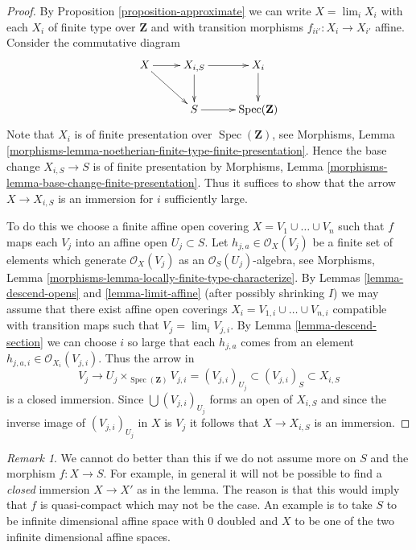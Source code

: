 \documentclass{stacks-project}
\theoremstyle{plain}
\theoremstyle{definition}
\theoremstyle{remark}
\newtheorem{remark}[subsection]{Remark}
\numberwithin{equation}{subsection}
\def\lim{\mathop{\mathrm{lim}}\nolimits}
\def\Spec{\mathop{\mathrm{Spec}}}
\begin{document}
\begin{proof}
By
Proposition \ref{proposition-approximate}
we can write
$X = \lim_i X_i$ with each $X_i$ of finite type over $\mathbf{Z}$ and
with transition morphisms $f_{ii'} : X_i \to X_{i'}$ affine.
Consider the commutative diagram
$$
\xymatrix{
X \ar[r] \ar[rd] & X_{i, S} \ar[r] \ar[d] & X_i \ar[d] \\
& S \ar[r] & \Spec(\mathbf{Z})
}
$$
Note that $X_i$ is of finite presentation over $\Spec(\mathbf{Z})$, see
Morphisms,
Lemma \ref{morphisms-lemma-noetherian-finite-type-finite-presentation}.
Hence the base change $X_{i, S} \to S$ is of finite presentation by
Morphisms, Lemma \ref{morphisms-lemma-base-change-finite-presentation}.
Thus it suffices to show that the arrow $X \to X_{i, S}$ is an
immersion for $i$ sufficiently large.

\medskip\noindent
To do this we choose a finite affine open covering
$X = V_1 \cup \ldots \cup V_n$ such that
$f$ maps each $V_j$ into an affine open $U_j \subset S$.
Let $h_{j, a} \in \mathcal{O}_X(V_j)$ be a finite
set of elements which generate $\mathcal{O}_X(V_j)$ as
an $\mathcal{O}_S(U_j)$-algebra, see
Morphisms, Lemma \ref{morphisms-lemma-locally-finite-type-characterize}.
By Lemmas \ref{lemma-descend-opens} and \ref{lemma-limit-affine}
(after possibly shrinking $I$) we may assume that
there exist affine open coverings
$X_i = V_{1, i} \cup \ldots \cup V_{n, i}$
compatible with transition maps such that $V_j = \lim_i V_{j, i}$.
By Lemma \ref{lemma-descend-section} we can choose $i$ so large that each
$h_{j, a}$ comes from an element
$h_{j, a, i} \in \mathcal{O}_{X_i}(V_{j, i})$.
Thus the arrow in
$$
V_j \longrightarrow U_j \times_{\Spec(\mathbf{Z})} V_{j, i} =
(V_{j, i})_{U_j} \subset (V_{j, i})_S \subset X_{i, S}
$$
is a closed immersion. Since $\bigcup (V_{j, i})_{U_j}$ forms an open of
$X_{i, S}$ and since the inverse image of $(V_{j, i})_{U_j}$ in $X$
is $V_j$ it follows that $X \to X_{i, S}$ is an immersion.
\end{proof}

\begin{remark}
\label{remark-cannot-do-better}
We cannot do better than this if we do not assume
more on $S$ and the morphism $f : X \to S$.
For example, in general it will not be possible to
find a {\it closed} immersion $X \to X'$ as in the lemma.
The reason is that this would imply that $f$ is quasi-compact which
may not be the case. An example is to take $S$ to be infinite
dimensional affine space with $0$ doubled and $X$ to be one of
the two infinite dimensional affine spaces.
\end{remark}
\end{document}

